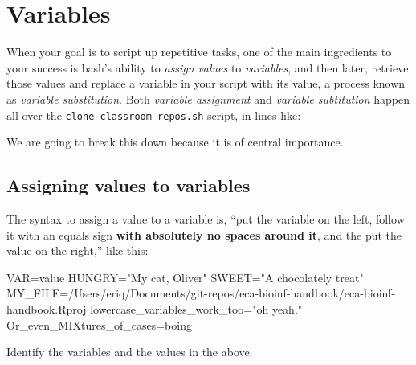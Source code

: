 \documentclass[]{krantz}
\makeatletter
\newenvironment{Shaded}{\begin{snugshade}}{\end{snugshade}}
\newcommand{\NormalTok}[1]{#1}
\newcommand{\StringTok}[1]{\textcolor[rgb]{0.5,0.5,0.5}{#1}}
\newcommand{\VariableTok}[1]{\textcolor[rgb]{0,0,0}{#1}}
\newenvironment{kframe}{%
\medskip{}
\setlength{\fboxsep}{.8em}
 \def\at@end@of@kframe{}%
 \ifinner\ifhmode%
  \def\at@end@of@kframe{\end{minipage}}%
  \begin{minipage}{\columnwidth}%
 \fi\fi%
 \def\FrameCommand##1{\hskip\@totalleftmargin \hskip-\fboxsep
 \colorbox{shadecolor}{##1}\hskip-\fboxsep
     \hskip-\linewidth \hskip-\@totalleftmargin \hskip\columnwidth}%
 \MakeFramed {\advance\hsize-\width
   \@totalleftmargin\z@ \linewidth\hsize
   \@setminipage}}%
 {\par\unskip\endMakeFramed%
 \at@end@of@kframe}
\renewenvironment{Shaded}{\begin{kframe}}{\end{kframe}}
\makeatother
\begin{document}
\hypertarget{variables}{%
\section{Variables}\label{variables}}

When your goal is to script up repetitive tasks, one of the main ingredients to your
success is bash's ability to \emph{assign} \emph{values} to \emph{variables}, and then later, retrieve
those values and replace a variable in your script with its value, a process
known as \emph{variable substitution}. Both \emph{variable assignment} and
\emph{variable subtitution} happen all over the \texttt{clone-classroom-repos.sh}
script, in lines like:

\begin{Shaded}
\end{Shaded}

We are going to break this down because it is of central importance.

\hypertarget{assigning-values-to-variables}{%
\subsection{Assigning values to variables}\label{assigning-values-to-variables}}

The syntax to assign a value to a variable is, ``put the variable on the left, follow it
with an equals sign \textbf{with absolutely no spaces around it}, and the put the value
on the right,'' like this:

\begin{Shaded}
\begin{Highlighting}[]
\VariableTok{VAR=}\NormalTok{value}
\VariableTok{HUNGRY=}\StringTok{"My cat, Oliver"}
\VariableTok{SWEET=}\StringTok{"A chocolately treat"}
\VariableTok{MY_FILE=}\NormalTok{/Users/eriq/Documents/git-repos/eca-bioinf-handbook/eca-bioinf-handbook.Rproj}
\VariableTok{lowercase_variables_work_too=}\StringTok{"oh yeah."}
\VariableTok{Or_even_MIXtures_of_cases=}\NormalTok{boing}
\end{Highlighting}
\end{Shaded}

Identify the variables and the values in the above.
\end{document}
